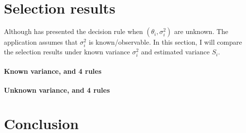 \documentclass[12pt]{article}
\begin{document}
\section{Selection results}

Although \cite{gu2023invidious} has presented the decision rule when
$(\theta_i,\sigma_i^2)$ are unknown. The application assumes that $\sigma_i^2$
is known/observable. In this section, I will compare the selection results
under known variance $\sigma_i^2$ and estimated variance $S_i$.

\paragraph{Known variance, and 4 rules}
\paragraph{Unknown variance, and 4 rules}

\section{Conclusion}

\newpage

\end{document}
